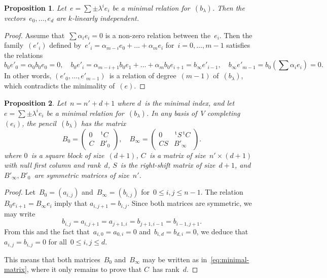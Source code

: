 \documentclass{article}%
\newtheorem{prop}{Proposition}
\def\transpose{\,{}^{\mathrm{t}\!}}
\def\mat#1{\begin{pmatrix}#1\end{pmatrix}}
\begin{document}
\begin{prop}\label{prop:minimal-indep}
Let~$e = ∑ ± λ^i e_i$ be a minimal relation for~$(b_{λ})$. Then the
vectors~$e_0,…,e_{d}$ are $k$-linearly independent.
\end{prop}

\begin{proof}
Assume that~$∑ α_i e_i = 0$ is a non-zero relation between the~$e_i$.
Then the family~$(e'_i)$ defined by~$e'_i = α_{m-i} e_0 + … + α_m
e_{i}$ for~$i = 0, …, m-1$ satisfies the relations
\begin{equation}\label{eq:relation-e'}
b_0 e'_0 = α_0 b_0 e_0 = 0, \quad
b_0 e'_{i} = α_{m-i+1} b_0 e_1 + … + α_{m} b_0 e_{i+1} = b_{∞} e'_{i-1}, \quad
b_{∞} e'_{m-1} = b_0(∑ α_i e_i) = 0.
\end{equation}
In other words, $(e'_0,…, e'_{m-1})$~is a relation of degree~$(m-1)$
of~$(b_{λ})$, which contradicts the minimality of~$(e)$.
\end{proof}


\begin{prop}\label{prop:minimal-matrix}
Let~$n = n'+d+1$ where $d$~is the minimal index, and let~$e = ∑ ± λ^i
e_i$ be a minimal relation for~$(b_{λ})$. In any basis of~$V$
completing~$(e_i)$, the pencil~$(b_{λ})$ has the matrix
\begin{equation}\label{eq:minimal-matrix}
B_{0} = \mat{0 & \transpose{C}\\ C & B'_{0}}, \quad
B_{∞} = \mat{0 & \transpose{S} \transpose{C}\\ CS & B'_{∞}}.
\end{equation}
where $0$~is a square block of size~$(d+1)$, $C$~is a matrix of size~$n'
× (d+1)$ with null first column and rank~$d$, $S$~is the right-shift
matrix of size~$d+1$, and $B'_{∞}, B'_0$~are symmetric matrices of
size~$n'$.
\end{prop}

\begin{proof}
Let~$B_{0} = (a_{i,j})$ and~$B_{∞} = (b_{i,j})$ for~$0 ≤ i,j ≤ n-1$. The
relation~$B_{0} e_{i+1} = B_{∞} e_{i}$ imply that $a_{i,j+1} = b_{i,j}$.
Since both matrices are symmetric, we may write
\begin{equation}\label{eq:zero-bij}
b_{i,j} = a_{i,j+1} = a_{j+1, i} = b_{j+1, i-1} = b_{i-1, j+1}.
\end{equation}
From this and the fact that~$a_{i,0} = a_{0,i} = 0$ and~$b_{i, d} =
b_{d,i} = 0$, we deduce that~$a_{i,j} = b_{i,j} = 0$ for all~$0 ≤ i, j ≤
d$.

This means that both matrices~$B_{0}$ and~$B_{∞}$ may be written as
in~\ref{eq:minimal-matrix}, where it only remains to prove that $C$~has
rank~$d$.

\medskip

\end{proof}
\end{document}
